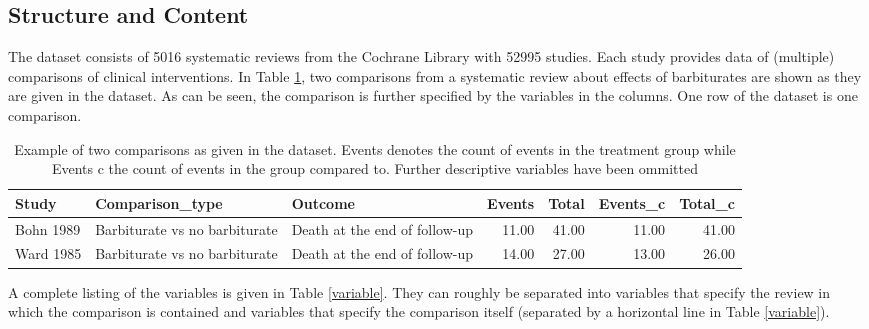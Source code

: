 \documentclass[11pt,a4paper,twoside]{book}\usepackage[]{graphicx}\usepackage[]{color}
\begin{document}
\subsection{Structure and Content}
The dataset consists of 5016 systematic reviews from the Cochrane Library with 52995 studies.
Each study provides data of (multiple) comparisons of clinical interventions. 
In Table \ref{barbiturate.row}, two comparisons from a systematic review about effects of barbiturates are shown as they are given in the dataset. As can be seen, the comparison is further specified by the variables in the columns. One row of the dataset is one comparison.

\begin{table}[ht]
\centering
\begingroup\scriptsize
\begin{tabular}{lllrrrr}
  \hline
Study & Comparison\_type & Outcome & Events & Total & Events\_c & Total\_c \\ 
  \hline
Bohn 1989 & Barbiturate vs no barbiturate & Death at the end of follow-up & 11.00 & 41.00 & 11.00 & 41.00 \\ 
  Ward 1985 & Barbiturate vs no barbiturate & Death at the end of follow-up & 14.00 & 27.00 & 13.00 & 26.00 \\ 
   \hline
\end{tabular}
\endgroup
\caption{Example of two comparisons as given in the dataset. Events denotes the count of events in the treatment group while Events c the count of events in the group compared to. Further descriptive variables have been ommitted} 
\label{barbiturate.row}
\end{table}


A complete listing of the variables is given in Table \ref{variable}. They can roughly be separated into variables that specify the review in which the comparison is contained and variables that specify the comparison itself (separated by a horizontal line in Table \ref{variable}).
\end{document}

